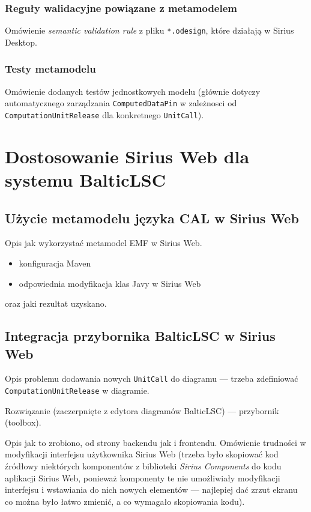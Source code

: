 \subsection{Reguły walidacyjne powiązane z
	metamodelem}\label{sec:regulky-walidacyjne-metamodel}

Omówienie \textit{semantic validation rule} z pliku \texttt{*.odesign}, które
działają w Sirius Desktop.

\subsection{Testy metamodelu}

Omówienie dodanych testów jednostkowych modelu (głównie dotyczy automatycznego
zarządzania \texttt{ComputedDataPin} w zależnosci od
\texttt{ComputationUnitRelease} dla konkretnego \texttt{UnitCall}).

\chapter{Dostosowanie Sirius Web dla systemu BalticLSC}

\section{Użycie metamodelu języka CAL w Sirius Web}

Opis jak wykorzystać metamodel EMF w Sirius Web.

\begin{itemize}
	\item konfiguracja Maven
	\item odpowiednia modyfikacja klas Javy w Sirius Web
\end{itemize}

\noindent oraz jaki rezultat uzyskano.

\section{Integracja przybornika BalticLSC w Sirius Web}

Opis problemu dodawania nowych \texttt{UnitCall} do diagramu --- trzeba
zdefiniować \texttt{ComputationUnitRelease} w diagramie.

Rozwiązanie (zaczerpnięte z edytora diagramów BalticLSC) --- przybornik
(toolbox).

Opis jak to zrobiono, od strony backendu jak i frontendu. Omówienie trudności w
modyfikacji interfejsu użytkownika Sirius Web (trzeba było skopiować kod
źródłowy niektórych komponentów z biblioteki \textit{Sirius Components} do kodu
aplikacji Sirius Web, ponieważ komponenty te nie umożliwiały modyfikacji
interfejsu i wstawiania do nich nowych elementów --- najlepiej dać zrzut ekranu
co można było łatwo zmienić, a co wymagało skopiowania kodu).

